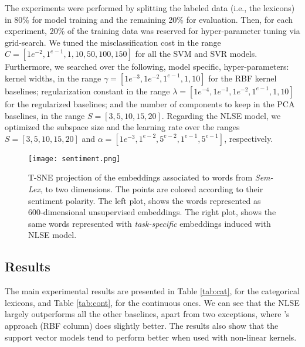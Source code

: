 \documentclass[letterpaper]{article}
\newcommand{\newcite}[1]{\citeauthor{#1} \shortcite{#1}}
\begin{document}
The experiments were performed by splitting the labeled data (i.e., the lexicons) in 80\% for model training and the remaining 20\% for evaluation. Then, for each experiment, 20\% of the training data was reserved for hyper-parameter tuning via grid-search. We tuned the misclassification cost in the range ${C=[1e^{-2}, 1^{e-1}, 1, 10,50,100,150]}$ for all the SVM and SVR models. Furthermore, we searched over the following, model specific, hyper-parameters: kernel widths, in the range ${\gamma=[1e^{-3}, 1e^{-2}, 1^{e-1}, 1, 10]}$ for the RBF kernel baselines; regularization constant in the range ${\lambda=[1e^{-4}, 1e^{-3}, 1e^{-2}, 1^{e-1}, 1, 10]}$ for the regularized baselines; and the number of components to keep in the PCA baselines, in the range ${S=[3, 5,10,15,20]}$. Regarding the NLSE model, we optimized the subspace size and the learning rate over the ranges ${S=[3, 5,10,15,20]}$ and ${\alpha=[1e^{-3}, 1^{e-2}, 5^{e-2},1^{e-1},5^{e-1}]}$, respectively. 

\begin{figure*}[htb]
\centering
\texttt{[image: sentiment.png]}
\caption{T-SNE projection of the embeddings associated to words from \textsl{Sem-Lex}, to two dimensions. The points are colored according to their sentiment polarity. The left plot, shows the words represented as 600-dimensional unsupervised embeddings. The right plot, shows the same words represented with \textit{task-specific} embeddings induced with NLSE model.}
\label{fig:sentiment_emb}
\end{figure*}



\subsection{Results}

The main experimental results are presented in Table \ref{tab:cat}, for the categorical lexicons, and Table \ref{tab:cont}, for the continuous ones. We can see that the NLSE largely outperforms all the other baselines, apart from two exceptions, where \newcite{Amir}'s approach (RBF column) does slightly better. The results also show that the support vector models tend to perform better when used with non-linear kernels.
\end{document}
